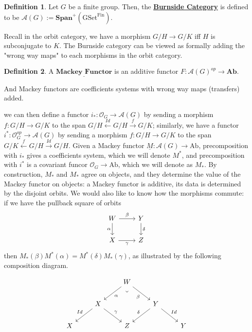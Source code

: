 \documentclass{article}
\theoremstyle{definition}
\theoremstyle{definition}
\newtheorem{definition}{Definition}[theorem]
\theoremstyle{definition}
\theoremstyle{definition}
\theoremstyle{definition}
\theoremstyle{definition}
\theoremstyle{definition}
\begin{document}
\begin{tcolorbox}[colback=purple!5!white,colframe=purple!75!black]
\begin{definition}
Let $G$ be a finite group. Then, the \underline{\textbf{Burnside Category}} is defined to be $\mathcal{A}(G):=\textbf{Span}^+(\textrm{GSet}^{\textrm{Fin}})$.
\end{definition}
\end{tcolorbox}
Recall in the orbit category, we have a morphism $G/H\to G/K$ iff $H$ is subconjugate to $K$. The Burnside category can be viewed as formally adding the "wrong way maps" to each morphisms in the orbit category. 

\begin{tcolorbox}[colback=purple!5!white,colframe=purple!75!black]
\begin{definition}
A $\underline{\textbf{Mackey Functor}}$ is an additive functor $F: \mathcal{A}(G)^{op}\to \textbf{Ab}$. 
\end{definition}
\end{tcolorbox}
And Mackey functors are coefficients systems with wrong way maps (transfers) added. 



we can then define a functor $i_*:\mathcal{O}_G\to \mathcal{A}(G)$ by sending a morphism $f:G/H\to G/K$ to the span $G/H\xleftarrow{Id}G/H\xrightarrow{f}G/K$; similarly, we have a functor $i^*:\mathcal{O}^{op}_G\to \mathcal{A}(G)$ by sending a morphism $f:G/H\to G/K$ to the span $G/K\xleftarrow{f}G/H\xrightarrow{Id}G/H$. Given a Mackey functor $\underline{M}: \mathcal{A}(G)\to \textrm{Ab}$, precomposition with $i_*$ gives a coefficients system, which we will denote $M^*$, and precomposition with $i^*$ is a covariant funcor $\mathcal{O}_G\to \textrm{Ab}$, which we will denote as $M_*$. By construction, $M_*$ and $M_*$ agree on objects, and they determine the value of the Mackey functor on objects: a Mackey functor is additive, its data is determined by the disjoint orbits. We would also like to know how the morphisms commute: if we have the pullback square of orbits
\[\begin{tikzcd}
	W & Y \\
	X & Z
	\arrow["\beta", from=1-1, to=1-2]
	\arrow["\alpha"', from=1-1, to=2-1]
	\arrow["\delta", from=1-2, to=2-2]
	\arrow["\gamma"', from=2-1, to=2-2]
\end{tikzcd}\]
then $M_*(\beta)M^*(\alpha)=M^*(\delta)M_*(\gamma)$, as illustrated by the following composition diagram. 

\[\begin{tikzcd}
	&& W \\
	& X && Y \\
	X && Z & {} & Y
	\arrow["\alpha", from=1-3, to=2-2]
	\arrow["\beta"', from=1-3, to=2-4]
	\arrow["\lrcorner"{anchor=center, pos=0.125, rotate=-45}, draw=none, from=1-3, to=3-3]
	\arrow["Id"', from=2-2, to=3-1]
	\arrow["\gamma", from=2-2, to=3-3]
	\arrow["\delta"', from=2-4, to=3-3]
	\arrow["Id", from=2-4, to=3-5]
\end{tikzcd}\]
\end{document}

